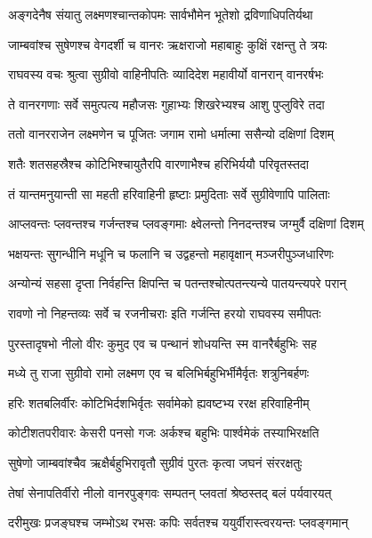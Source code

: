 \twolineshloka
{अङ्गदेनैष संयातु लक्ष्मणश्चान्तकोपमः}
{सार्वभौमेन भूतेशो द्रविणाधिपतिर्यथा} %

\twolineshloka
{जाम्बवांश्च सुषेणश्च वेगदर्शी च वानरः}
{ऋक्षराजो महाबाहुः कुक्षिं रक्षन्तु ते त्रयः} %

\twolineshloka
{राघवस्य वचः श्रुत्वा सुग्रीवो वाहिनीपतिः}
{व्यादिदेश महावीर्यो वानरान् वानरर्षभः} %

\twolineshloka
{ते वानरगणाः सर्वे समुत्पत्य महौजसः}
{गुहाभ्यः शिखरेभ्यश्च आशु पुप्लुविरे तदा} %

\twolineshloka
{ततो वानरराजेन लक्ष्मणेन च पूजितः}
{जगाम रामो धर्मात्मा ससैन्यो दक्षिणां दिशम्} %

\twolineshloka
{शतैः शतसहस्रैश्च कोटिभिश्चायुतैरपि}
{वारणाभैश्च हरिभिर्ययौ परिवृतस्तदा} %

\twolineshloka
{तं यान्तमनुयान्ती सा महती हरिवाहिनी}
{हृष्टाः प्रमुदिताः सर्वे सुग्रीवेणापि पालिताः} %

\twolineshloka
{आप्लवन्तः प्लवन्तश्च गर्जन्तश्च प्लवङ्गमाः}
{क्ष्वेलन्तो निनदन्तश्च जग्मुर्वै दक्षिणां दिशम्} %

\twolineshloka
{भक्षयन्तः सुगन्धीनि मधूनि च फलानि च}
{उद्वहन्तो महावृक्षान् मञ्जरीपुञ्जधारिणः} %

\twolineshloka
{अन्योन्यं सहसा दृप्ता निर्वहन्ति क्षिपन्ति च}
{पतन्तश्चोत्पतन्त्यन्ये पातयन्त्यपरे परान्} %

\twolineshloka
{रावणो नो निहन्तव्यः सर्वे च रजनीचराः}
{इति गर्जन्ति हरयो राघवस्य समीपतः} %

\twolineshloka
{पुरस्तादृषभो नीलो वीरः कुमुद एव च}
{पन्थानं शोधयन्ति स्म वानरैर्बहुभिः सह} %

\twolineshloka
{मध्ये तु राजा सुग्रीवो रामो लक्ष्मण एव च}
{बलिभिर्बहुभिर्भीमैर्वृतः शत्रुनिबर्हणः} %

\twolineshloka
{हरिः शतबलिर्वीरः कोटिभिर्दशभिर्वृतः}
{सर्वामेको ह्यवष्टभ्य ररक्ष हरिवाहिनीम्} %

\twolineshloka
{कोटीशतपरीवारः केसरी पनसो गजः}
{अर्कश्च बहुभिः पार्श्वमेकं तस्याभिरक्षति} %

\twolineshloka
{सुषेणो जाम्बवांश्चैव ऋक्षैर्बहुभिरावृतौ}
{सुग्रीवं पुरतः कृत्वा जघनं संररक्षतुः} %

\twolineshloka
{तेषां सेनापतिर्वीरो नीलो वानरपुङ्गवः}
{सम्पतन् प्लवतां श्रेष्ठस्तद् बलं पर्यवारयत्} %

\twolineshloka
{दरीमुखः प्रजङ्घश्च जम्भोऽथ रभसः कपिः}
{सर्वतश्च ययुर्वीरास्त्वरयन्तः प्लवङ्गमान्} %

